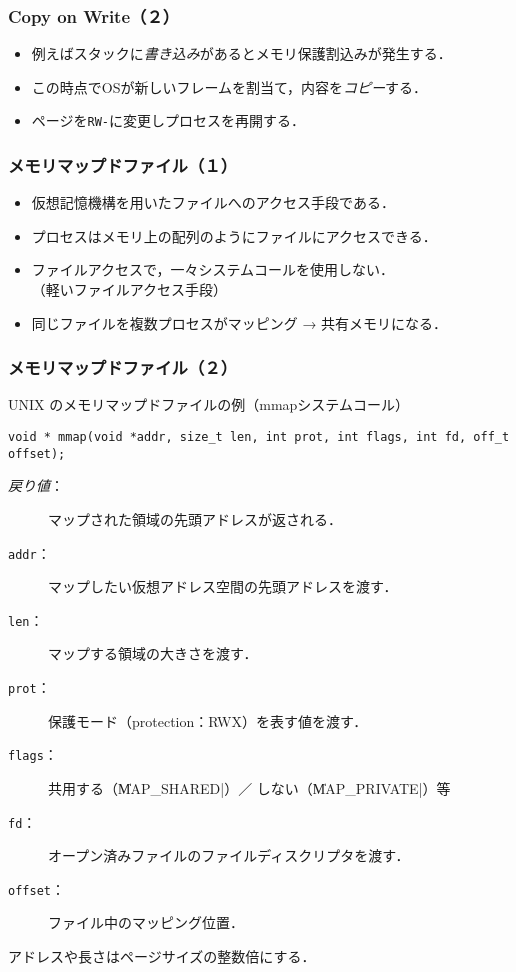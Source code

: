 \documentclass{beamer}                   %
\begin{document}
\begin{frame}
  \frametitle{Copy on Write（２）}
  \begin{itemize}
  \item 例えばスタックに\emph{書き込み}があるとメモリ保護割込みが発生する．
  \item この時点でOSが新しいフレームを割当て，内容を\emph{コピー}する．
  \item ページを\texttt{RW-}に変更しプロセスを再開する．
  \end{itemize}
\end{frame}

\begin{frame}
  \frametitle{メモリマップドファイル（１）}
  \begin{itemize}
  \item 仮想記憶機構を用いたファイルへのアクセス手段である．
  \item プロセスはメモリ上の配列のようにファイルにアクセスできる．
  \item ファイルアクセスで，一々システムコールを使用しない．\\
    （軽いファイルアクセス手段）
  \item 同じファイルを複数プロセスがマッピング → 共有メモリになる．
  \end{itemize}
\end{frame}

\begin{frame}[fragile]
  \frametitle{メモリマップドファイル（２）}
  UNIX のメモリマップドファイルの例（mmapシステムコール）

\begin{lstlisting}[numbers=none]
void * mmap(void *addr, size_t len, int prot, int flags, int fd, off_t offset);
\end{lstlisting}

  \begin{description}
  \item[\emph{戻り値}：] マップされた領域の先頭アドレスが返される．
  \item[\texttt{addr}：] マップしたい仮想アドレス空間の先頭アドレスを渡す．
  \item[\texttt{len}：] マップする領域の大きさを渡す．
  \item[\texttt{prot}：] 保護モード（protection：RWX）を表す値を渡す．
  \item[\texttt{flags}：]共用する（\|MAP_SHARED|）／
    しない（\|MAP_PRIVATE|）等
  \item[\texttt{fd}：] オープン済みファイルのファイルディスクリプタを渡す．
  \item[\texttt{offset}：] ファイル中のマッピング位置．
  \end{description}

  アドレスや長さはページサイズの整数倍にする．
\end{frame}
\end{document}
